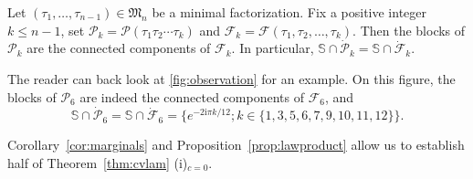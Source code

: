 \documentclass[AHL,XML,longabstracts,Unicode]{cedram}
\def\S{\mathbb{S}}
\def\PPP{\mathcal P}
\def\FFF{\mathcal F}
\begin{document}
\begin{lemma}
\label{lem:observation}
Let $(\tau_{1}, \ldots, \tau_{n-1}) \in \mathfrak{M}_{n}$ be a minimal factorization.
Fix a positive integer $k \leq n-1$, set  $\PPP_{k}= \PPP(\tau_{1} \tau_{2}\cdots \tau_{k})$ and $ \FFF_{k}=\FFF(\tau_{1} ,\tau_{2} ,\ldots ,\tau_{k})$. Then the blocks of $\PPP_{k}$ are the connected components of $\FFF_{k}$. In particular, $\S \cap \dot{\PPP}_{k}=\S \cap \dot{\FFF}_{k}$.
\end{lemma}

The reader can back look at \cref{fig:observation} for an example.
On this figure, the blocks of $\PPP_{6}$ are indeed the connected components of $\FFF_{6}$,
and  \[\S \cap \dot{\PPP}_{6}=\S \cap \dot{\FFF}_{6} =  \{ e^{- 2 \textrm{i} \pi {k}/{12}}; k \in \{1,3,5,6,7,9,10,11,12\} \}.\]

Corollary~\ref{cor:marginals} and Proposition~\ref{prop:lawproduct} allow us to establish half of Theorem~\ref{thm:cvlam} (i)$_{c=0}$.
\end{document}
